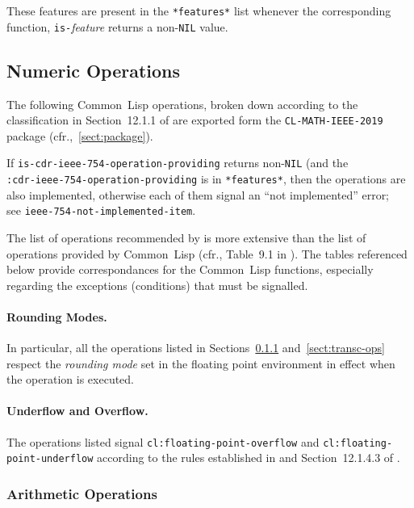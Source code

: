 \documentclass[10pt,fleqn]{article}
\newcommand{\CL}{\textsf{Common~Lisp}}
\newcommand{\code}[1]{\texttt{#1}}
\newcommand{\clieeeterm}[1]{\textit{#1}}
\begin{document}
These features are present in the \code{*features*} list whenever the
corresponding function, \code{is-}\emph{feature} returns a
non-\code{NIL} value.

\subsection{Numeric Operations}

The following \CL{} operations, broken down according to the
classification in Section~12.1.1 of \cite{1996:ANSIHyperSpec} are exported
form the \code{CL-MATH-IEEE-2019} package
(cfr.,~\ref{sect:package}).

If \code{is-cdr-ieee-754-operation-providing} returns non-\code{NIL}
(and the\\
\code{:cdr-ieee-754-operation-providing} is in
\code{*features*}, then the operations are also implemented, otherwise
each of them signal an ``not implemented'' error;\\
see \code{ieee-754-not-implemented-item}.

The list of operations
recommended by \cite{2008:IEEE-754} is more extensive than the list of
operations provided by \CL{} (cfr., Table~9.1 in \cite{2008:IEEE-754}).
%
The tables referenced below provide correspondances for the \CL{} functions,
especially regarding the exceptions (conditions) that must be
signalled.

\paragraph{Rounding Modes.} In particular, all the operations listed
in Sections~\ref{sect:arith-ops} and~\ref{sect:transc-ops} respect the
\clieeeterm{rounding mode} set in the floating point
environment in effect when the operation is executed.

\paragraph{Underflow and Overflow.}  The operations listed signal
\code{cl:floating-point-overflow} and
\code{cl:floating-point-underflow} according to the rules established
in \cite{2008:IEEE-754} and Section~12.1.4.3 of \cite{1996:ANSIHyperSpec}.



\subsubsection{Arithmetic Operations}
\label{sect:arith-ops}
\end{document}
